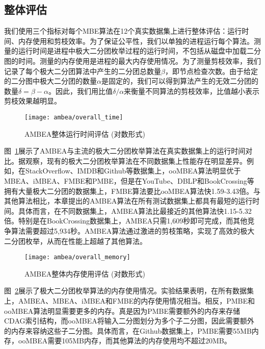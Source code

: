 \subsection{整体评估}
\label{subsec:ambea_exp_overall}

我们使用三个指标对每个MBE算法在12个真实数据集上进行整体评估：运行时间、内存使用和剪枝效率。为了保证公平性，我们以单独的进程运行每个算法。测量的运行时间是进程中极大二分团枚举过程的运行时间，不包括从磁盘中加载二分图的时间。测量的内存使用是进程的最大内存使用情况。为了测量剪枝效率，我们记录了每个极大二分团算法中产生的二分团总数量$\beta$，即节点检查次数。由于给定的二分图中极大二分团的数量$\alpha$是固定的，我们可以得到算法产生的无效二分团的数量$\delta=\beta-\alpha$。因此，我们用比值$\delta/\alpha$来衡量不同算法的剪枝效率，比值越小表示剪枝效果越明显。

\begin{figure} [H]
  \centering
  \texttt{[image: ambea/overall\_time]}
  \caption{AMBEA整体运行时间评估 (对数形式)}
  \label{fig:ambea_overall_time}
\end{figure}

图~\ref{fig:ambea_overall_time}展示了AMBEA与主流的极大二分团枚举算法在真实数据集上的运行时间对比。据观察，现有的极大二分团枚举算法在不同数据集上性能存在明显差异。例如，在StackOverflow、IMDB和Github等数据集上，ooMBEA算法明显优于MBEA、iMBEA、FMBE和PMBE，但是在YouTube、DBLP和BookCrossing等拥有大量极大二分团的数据集上，FMBE算法要比ooMBEA算法快1.59-3.43倍。与其他算法相比，本章提出的AMBEA算法在所有测试数据集上都具有最短的运行时间。具体而言，在不同数据集上，AMBEA算法比最接近的其他算法快1.15-5.32倍。特别是在BookCrossing数据集上，AMBEA只需1,609秒即可完成，而其他竞争算法需要超过5,934秒。AMBEA算法通过激进的剪枝策略，实现了高效的极大二分团枚举，从而在性能上超越了其他算法。

\begin{figure} [H]
  \centering
  \texttt{[image: ambea/overall\_memory]}
  \caption{AMBEA整体内存使用评估 (对数形式)}
  \label{fig:ambea_overall_memory}
\end{figure}

图~\ref{fig:ambea_overall_memory}展示了极大二分团枚举算法的内存使用情况。实验结果表明，在所有数据集上，AMBEA、MBEA、iMBEA和FMBE的内存使用情况相当。相反，PMBE和ooMBEA算法明显需要更多的内存。真是因为PMBE需要额外的内存来存储CDAG索引结构，而ooMBEA将输入二分图划分为多个子二分图，因此需要额外的内存来容纳这些子二分图。具体而言，在Github数据集上，PMBE需要55MB内存，ooMBEA需要105MB内存，而其他算法的内存使用均不超过20MB。

